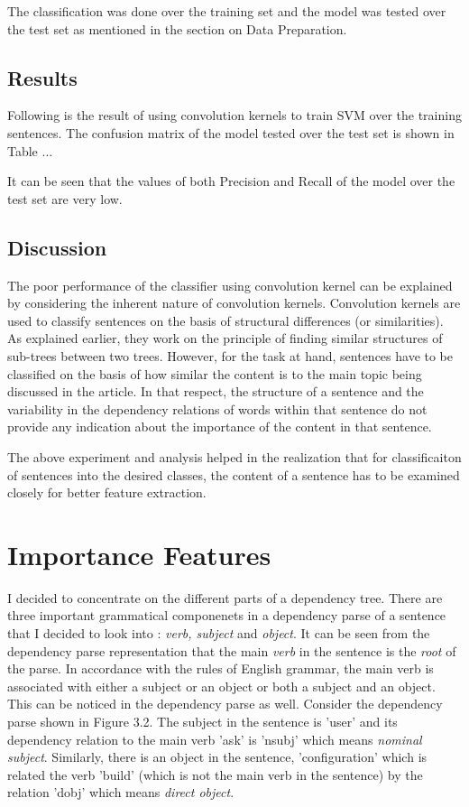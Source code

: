 The classification was done over the training set and the model was tested over the test set as mentioned in the section on Data Preparation.

\subsection{Results}
Following is the result of using convolution kernels to train SVM over the training sentences.
The confusion matrix of the model tested over the test set is shown in Table ...

It can be seen that the values of both Precision and Recall of the model over the test set are very low.

\subsection{Discussion}
The poor performance of the classifier using convolution kernel can be explained by considering the inherent nature of convolution kernels.
Convolution kernels are used to classify sentences on the basis of structural differences (or similarities).
As explained earlier, they work on the principle of finding similar structures of sub-trees between two trees.
However, for the task at hand, sentences have to be classified on the basis of how similar the content is to the main topic being discussed in the article.
In that respect, the structure of a sentence and the variability in the dependency relations of words within that sentence do not provide any indication about the importance of the content in that sentence.

The above experiment and analysis helped in the realization that for classificaiton of sentences into the desired classes, the content of a sentence has to be examined closely for better feature extraction.

\section{Importance Features}
I decided to concentrate on the different parts of a dependency tree.
There are three important grammatical componenets in a dependency parse of a sentence that I decided to look into : \textit{verb, subject} and \textit{object}.
It can be seen from the dependency parse representation that the main \textit{verb} in the sentence is the \textit{root} of the parse.
In accordance with the rules of English grammar, the main verb is associated with either a subject or an object or both a subject and an object.
This can be noticed in the dependency parse as well.
Consider the dependency parse shown in Figure 3.2.
The subject in the sentence is 'user' and its dependency relation to the main verb 'ask' is 'nsubj' which means \textit{nominal subject}.
Similarly, there is an object in the sentence, 'configuration' which is related the verb 'build' (which is not the main verb in the sentence) by the relation 'dobj' which means \textit{direct object}.

